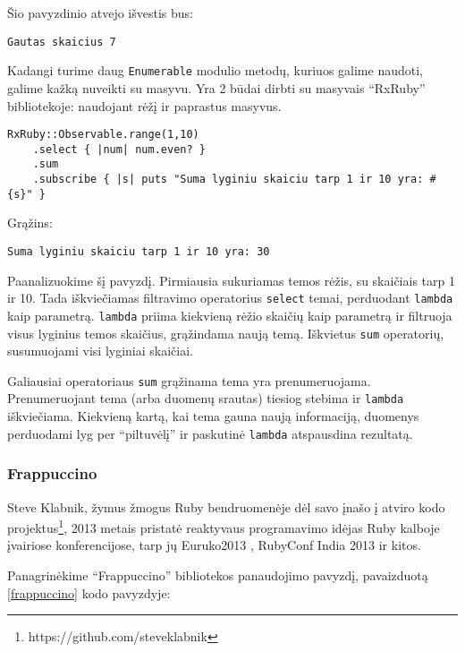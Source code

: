 Šio pavyzdinio atvejo išvestis bus:

\begin{lstlisting}[]
  Gautas skaicius 7
\end{lstlisting}

Kadangi turime daug \lstinline|Enumerable| modulio metodų, kuriuos galime naudoti, galime kažką nuveikti su masyvu. Yra 2 būdai dirbti su masyvais ``RxRuby'' bibliotekoje: naudojant rėžį ir paprastus masyvus.

\begin{lstlisting}[]
  RxRuby::Observable.range(1,10)
    .select { |num| num.even? }
    .sum
    .subscribe { |s| puts "Suma lyginiu skaiciu tarp 1 ir 10 yra: #{s}" }
\end{lstlisting}

Grąžins:

\begin{lstlisting}[]
  Suma lyginiu skaiciu tarp 1 ir 10 yra: 30
\end{lstlisting}

Paanalizuokime šį pavyzdį. Pirmiausia sukuriamas temos rėžis, su skaičiais tarp 1 ir 10. Tada iškviečiamas filtravimo operatorius \lstinline|select| temai, perduodant \lstinline|lambda| kaip parametrą. \lstinline|lambda| priima kiekvieną rėžio skaičių kaip parametrą ir filtruoja visus lyginius temos skaičius, grąžindama naują temą. Iškvietus \lstinline|sum| operatorių, susumuojami visi lyginiai skaičiai.

Galiausiai operatoriaus \lstinline|sum| grąžinama tema yra prenumeruojama. Prenumeruojant tema (arba duomenų srautas) tiesiog stebima ir \lstinline|lambda| iškviečiama. Kiekvieną kartą, kai tema gauna naują informaciją, duomenys perduodami lyg per ``piltuvėlį'' ir paskutinė \lstinline|lambda| atspausdina rezultatą.

\subsubsection{Frappuccino}

Steve Klabnik, žymus žmogus Ruby bendruomenėje dėl savo įnašo į atviro kodo projektus\footnote{https://github.com/steveklabnik}, 2013 metais pristatė reaktyvaus programavimo idėjas Ruby kalboje įvairiose konferencijose, tarp jų Euruko2013 \cite{klabnik:euruko}, RubyConf India 2013 \cite{klabnik:india} ir kitos.

Panagrinėkime ``Frappuccino'' bibliotekos panaudojimo pavyzdį, pavaizduotą \ref{frappuccino} kodo pavyzdyje:

